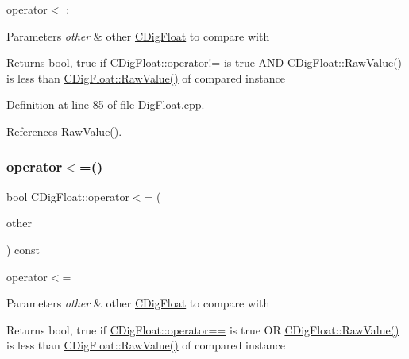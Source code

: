 operator$<$ \+: 


\begin{DoxyParams}{Parameters}
{\em other} & other \hyperlink{classCDigFloat}{C\+Dig\+Float} to compare with \\
\hline
\end{DoxyParams}
\begin{DoxyReturn}{Returns}
bool, true if \hyperlink{classCDigFloat_a15c13c035aff8184491bd9629403a33a}{C\+Dig\+Float\+::operator!=} is true A\+ND \hyperlink{classCDigFloat_ab6d3001a549d7496156321cbb26dde51}{C\+Dig\+Float\+::\+Raw\+Value()} is less than \hyperlink{classCDigFloat_ab6d3001a549d7496156321cbb26dde51}{C\+Dig\+Float\+::\+Raw\+Value()} of compared instance 
\end{DoxyReturn}


Definition at line 85 of file Dig\+Float.\+cpp.



References Raw\+Value().

\mbox{\label{classCDigFloat_a0c49ab029c7f0c610db1d29425353558}} 
\subsubsection{\texorpdfstring{operator$<$=()}{operator<=()}}
{\footnotesize\ttfamily bool C\+Dig\+Float\+::operator$<$= (\begin{DoxyParamCaption}\item[{const \hyperlink{classCDigFloat}{C\+Dig\+Float} \&}]{other }\end{DoxyParamCaption}) const}



operator$<$= 


\begin{DoxyParams}{Parameters}
{\em other} & other \hyperlink{classCDigFloat}{C\+Dig\+Float} to compare with \\
\hline
\end{DoxyParams}
\begin{DoxyReturn}{Returns}
bool, true if \hyperlink{classCDigFloat_ad8980d984bf2bab71d15b830fd0180a5}{C\+Dig\+Float\+::operator==} is true OR \hyperlink{classCDigFloat_ab6d3001a549d7496156321cbb26dde51}{C\+Dig\+Float\+::\+Raw\+Value()} is less than \hyperlink{classCDigFloat_ab6d3001a549d7496156321cbb26dde51}{C\+Dig\+Float\+::\+Raw\+Value()} of compared instance 
\end{DoxyReturn}


